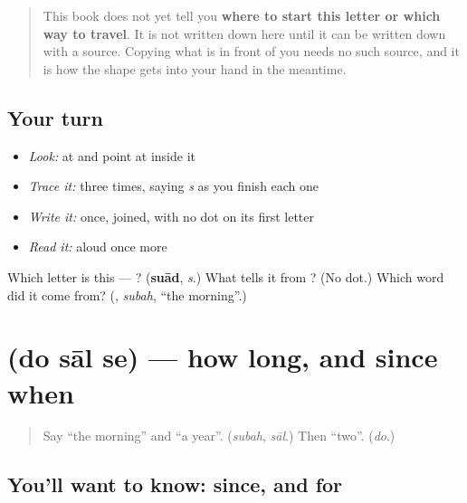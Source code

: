 \begin{quote}
This book does not yet tell you \textbf{where to start this letter or which way to travel}. It is not written down here until it can be written down with a source. Copying what is in front of you needs no such source, and it is how the shape gets into your hand in the meantime.
\end{quote}

\subsection*{Your turn}
\begin{itemize}
\raggedright
  \item \emph{Look:} at \textbf{} and point at  inside it
  \item \emph{Trace it:}  three times, saying \emph{s} as you finish each one
  \item \emph{Write it:} \textbf{} once, joined, with no dot on its first letter
  \item \emph{Read it:} \textbf{} aloud once more
\end{itemize}

\begin{tcolorbox}[breakable,colback=teal!4,colframe=teal!35!black,title={Before you move on}]
Which letter is this — ? (\textbf{suād}, \emph{s}.) What tells it from ? (No dot.) Which word did it come from? (\textbf{}, \emph{subah}, \textquotedblleft{}the morning\textquotedblright{}.)
\end{tcolorbox}
\section[\texorpdfstring{\ur{دو} \ur{سال} \ur{سے} (do sāl se)}{دو سال سے (do sāl se)}]{   (do sāl se) — how long, and since when}

\label{lesson:UR-C273-do-sal-se}



\begin{quote}
Say \textquotedblleft{}the morning\textquotedblright{} and \textquotedblleft{}a year\textquotedblright{}. (\emph{subah}, \emph{sāl}.) Then \textquotedblleft{}two\textquotedblright{}. (\emph{do}.)
\end{quote}

\subsection*{You'll want to know: since, and for}
\begin{quote}
\textbf{  }
\end{quote}

